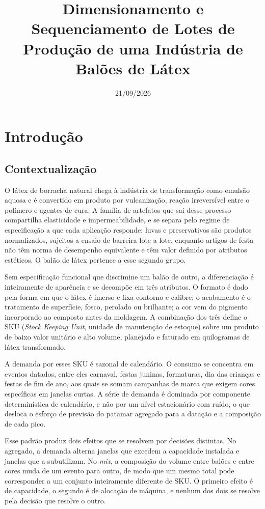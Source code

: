\documentclass[fleqn,12pt,a4paper]{article}
\title{Dimensionamento e Sequenciamento de Lotes de Produção de uma Indústria de Balões de Látex}
\author{}
\date{21/09/2026}
\begin{document}
\maketitle

\newpage

\section{Introdução}

\subsection{Contextualização}
\label{sec:contextualizacao}

O látex de borracha natural chega à indústria de transformação como emulsão aquosa e é convertido em produto por vulcanização, reação irreversível entre o polímero e agentes de cura. A família de artefatos que sai desse processo compartilha elasticidade e impermeabilidade, e se separa pelo regime de especificação a que cada aplicação responde: luvas e preservativos são produtos normalizados, sujeitos a ensaio de barreira lote a lote, enquanto artigos de festa não têm norma de desempenho equivalente e têm valor definido por atributos estéticos. O balão de látex pertence a esse segundo grupo.

Sem especificação funcional que discrimine um balão de outro, a diferenciação é inteiramente de aparência e se decompõe em três atributos. O formato é dado pela forma em que o látex é imerso e fixa contorno e calibre; o acabamento é o tratamento de superfície, fosco, perolado ou brilhante; a cor vem do pigmento incorporado ao composto antes da moldagem. A combinação dos três define o SKU (\textit{Stock Keeping Unit}, unidade de manutenção de estoque) sobre um produto de baixo valor unitário e alto volume, planejado e faturado em quilogramas de látex transformado.

A demanda por esses SKU é sazonal de calendário. O consumo se concentra em eventos datados, entre eles carnaval, festas juninas, formaturas, dia das crianças e festas de fim de ano, aos quais se somam campanhas de marca que exigem cores específicas em janelas curtas. A série de demanda é dominada por componente determinística de calendário, e não por um nível estacionário com ruído, o que desloca o esforço de previsão do patamar agregado para a datação e a composição de cada pico.

Esse padrão produz dois efeitos que se resolvem por decisões distintas. No agregado, a demanda alterna janelas que excedem a capacidade instalada e janelas que a subutilizam. No \textit{mix}, a composição do volume entre balões e entre cores muda de um evento para outro, de modo que um mesmo total pode corresponder a um conjunto inteiramente diferente de SKU. O primeiro efeito é de capacidade, o segundo é de alocação de máquina, e nenhum dos dois se resolve pela decisão que resolve o outro.
\end{document}
